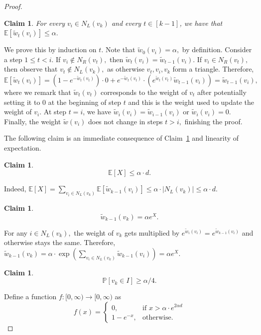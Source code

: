 \documentclass[10pt]{amsart}
\newenvironment{claimproof}[1][\proofname]{\proof[#1]\renewcommand{\qedsymbol}{$\blacksquare$}}{\endproof}
\newtheorem{claim}[theorem]{Claim}
\theoremstyle{definition}
\newcommand{\mbE}{\mathbb{E}}
\renewcommand{\Pr}{\mathbb{P}}
\begin{document}
\begin{proof}
\begin{claim} \label{claim:submartingale}
    For every $v_i\in N_L(v_k)$ and every $t\in [k-1]$, we have that $\mathbb{E}[\tilde{w}_t(v_i)]\le \alpha.$
\end{claim}
\begin{claimproof}
    We prove this by induction on $t$. Note that $\tilde{w}_0(v_i) = \alpha,$ by definition. Consider a step $1 \le t < i$. If $v_i \not\in N_R(v_t),$ then $\tilde{w}_{t}(v_i) = \tilde{w}_{t-1}(v_i).$ If $v_i \in N_R(v_t),$ then observe that $v_t \not\in N_L(v_k),$ as otherwise $v_t, v_i, v_k$ form a triangle. Therefore, $\mbE[\tilde{w}_t(v_i)] = (1 - e^{-\tilde{w}_t(v_t)}) \cdot 0 + e^{-\tilde{w}_t(v_t)} \cdot (e^{\tilde{w}_t(v_t)} \tilde{w}_{t-1}(v_i)) = \tilde{w}_{t-1}(v_i),$ where we remark that $\tilde{w}_t(v_t)$ corresponds to the weight of $v_t$ after potentially setting it to $0$ at the beginning of step $t$ and this is the weight used to update the weight of $v_i$. At step $t=i$, we have $\tilde{w}_i(v_i) = \tilde{w}_{i-1}(v_i)$ or $\tilde{w}_i(v_i) = 0$. Finally, the weight $\tilde{w}(v_i)$ does not change in steps $t > i,$ finishing the proof.
\end{claimproof}

The following claim is an immediate consequence of Claim~\ref{claim:submartingale} and linearity of expectation.
\begin{claim} \label{claim:expectation-of-X}
    \[ \mbE[X] \le \alpha \cdot d. \]
\end{claim}
\begin{claimproof}
    Indeed, $\mbE[X] = \sum_{v_i \in N_L(v_k)} \mbE[\tilde{w}_{k-1}(v_i)] \le \alpha \cdot |N_L(v_k)| \le \alpha \cdot d$.
\end{claimproof}
\begin{claim} \label{claim:w_tilde}
    \[ \tilde{w}_{k-1}(v_k) = \alpha e^X. \]
\end{claim}
\begin{claimproof}
    For any $i \in N_L(v_k),$ the weight of $v_k$ gets multiplied by $e^{\tilde{w}_i(v_i)} = e^{\tilde{w}_{k-1}(v_i)}$ and otherwise stays the same. Therefore, $\tilde{w}_{k-1}(v_k) = \alpha \cdot \exp\left(\sum_{v_i \in N_L(v_k)} \tilde{w}_{k-1}(v_i)\right) = \alpha e^X.$
\end{claimproof}

\begin{claim}
    \[ \Pr[v_k \in I] \ge \alpha / 4.\]
\end{claim}
\begin{claimproof}
    Define a function $f \colon [0, \infty) \rightarrow [0, \infty)$ as 
    \[ f(x) = 
    \begin{cases}
        0, &\text{if } x > \alpha \cdot e^{2 \alpha d} \\
        1 - e^{-x}, &\text{otherwise}.
    \end{cases}
    \]


\end{claimproof}
\end{proof}
\end{document}
